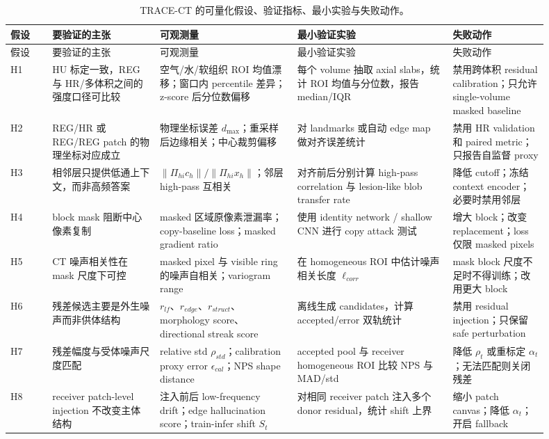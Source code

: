 \documentclass[11pt,a4paper,UTF8,fontset=fandol]{ctexart}
\theoremstyle{definition}
\begin{document}
\begin{longtable}{p{0.07\linewidth}p{0.18\linewidth}p{0.23\linewidth}p{0.26\linewidth}p{0.16\linewidth}}
\caption{TRACE-CT 的可量化假设、验证指标、最小实验与失败动作。}\label{tab:quantifiable-assumptions}\\
\toprule
假设 & 要验证的主张 & 可观测量 & 最小验证实验 & 失败动作 \\
\midrule
\endfirsthead
\toprule
假设 & 要验证的主张 & 可观测量 & 最小验证实验 & 失败动作 \\
\midrule
\endhead
H1 & HU 标定一致，REG 与 HR/多体积之间的强度口径可比较 & 空气/水/软组织 ROI 均值漂移；窗口内 percentile 差异；z-score 后分位数偏移 & 每个 volume 抽取 axial slabs，统计 ROI 均值与分位数，报告 median/IQR & 禁用跨体积 residual calibration；只允许 single-volume masked baseline \\
H2 & REG/HR 或 REG/REG patch 的物理坐标对应成立 & 物理坐标误差 $d_{\max}$；重采样后边缘相关；中心裁剪偏移 & 对 landmarks 或自动 edge map 做对齐误差统计 & 禁用 HR validation 和 paired metric；只报告自监督 proxy \\
H3 & 相邻层只提供低通上下文，而非高频答案 & $\|\Pi_{hi}c_h\|/\|\Pi_{hi}x_h\|$；邻层 high-pass 互相关 & 对齐前后分别计算 high-pass correlation 与 lesion-like blob transfer rate & 降低 cutoff；冻结 context encoder；必要时禁用邻层 \\
H4 & block mask 阻断中心像素复制 & masked 区域原像素泄漏率；copy-baseline loss；masked gradient ratio & 使用 identity network / shallow CNN 进行 copy attack 测试 & 增大 block；改变 replacement；loss 仅限 masked pixels \\
H5 & CT 噪声相关性在 mask 尺度下可控 & masked pixel 与 visible ring 的噪声自相关；variogram range & 在 homogeneous ROI 中估计噪声相关长度 $\ell_{corr}$ & mask block 尺度不足时不得训练；改用更大 block \\
H6 & 残差候选主要是外生噪声而非供体结构 & $r_{lf}$、$r_{edge}$、$r_{struct}$、morphology score、directional streak score & 离线生成 candidates，计算 accepted/error 双轨统计 & 禁用 residual injection；只保留 safe perturbation \\
H7 & 残差幅度与受体噪声尺度匹配 & relative std $\rho_{std}$；calibration proxy error $\epsilon_{cal}$；NPS shape distance & accepted pool 与 receiver homogeneous ROI 比较 NPS 与 MAD/std & 降低 $\rho_t$ 或重标定 $\alpha_t$；无法匹配则关闭残差 \\
H8 & receiver patch-level injection 不改变主体结构 & 注入前后 low-frequency drift；edge hallucination score；train-infer shift $S_t$ & 对相同 receiver patch 注入多个 donor residual，统计 shift 上界 & 缩小 patch canvas；降低 $\alpha_t$；开启 fallback \\

\end{longtable}
\end{document}
